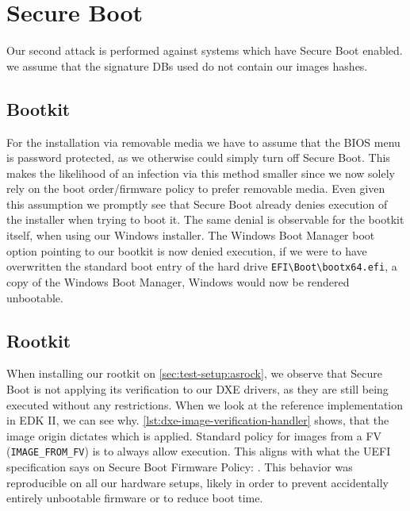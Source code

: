 
\section{Secure Boot}
\label{sec:attacks:secure-boot}

Our second attack is performed against systems which have Secure Boot enabled.
we assume that the signature \acp{DB} used do not contain our images hashes.

\subsection{Bootkit}

For the installation via removable media we have to assume that the \ac{BIOS} menu is password protected, as we otherwise could simply turn off Secure Boot.
This makes the likelihood of an infection via this method smaller since we now solely rely on the boot order/firmware policy to prefer removable media.
Even given this assumption we promptly see that Secure Boot already denies execution of the installer when trying to boot it.
The same denial is observable for the bootkit itself, when using our Windows installer.
The Windows Boot Manager boot option pointing to our bootkit is now denied execution, if we were to have overwritten the standard boot entry of the hard drive \lstinline{EFI\Boot\bootx64.efi}, a copy of the Windows Boot Manager, Windows would now be rendered unbootable.

\subsection{Rootkit}

When installing our rootkit on \autoref{sec:test-setup:asrock}, we observe that Secure Boot is not applying its verification to our \ac{DXE} drivers, as they are still being executed without any restrictions.
When we look at the reference implementation in \ac{EDK} II, we can see why.
\autoref{lst:dxe-image-verification-handler} shows, that the image origin dictates which is applied.
Standard policy for images from a \acf{FV} (\lstinline{IMAGE_FROM_FV}) is to always allow execution. This aligns with what the \ac{UEFI} specification says on Secure Boot Firmware Policy:
. This behavior was reproducible on all our hardware setups, likely in order to prevent accidentally entirely unbootable firmware or to reduce boot time.

